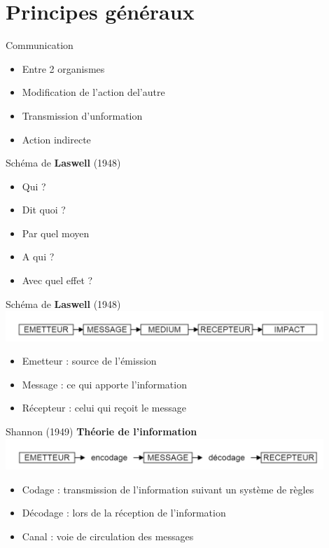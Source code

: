 \section{Principes généraux}

\begin{frame}
	\begin{block}{Communication}
		\begin{itemize}
			\item{Entre 2 organismes}
			\item{Modification de l'action del'autre}
			\item{Transmission d'unformation}
			\item{Action indirecte}
		\end{itemize}
	\end{block}
\end{frame}

\begin{frame}
	\begin{block}{Schéma de \textbf{Laswell} (1948)}
		\begin{itemize}
			\item{Qui ?}
			\item{Dit quoi ?}
			\item{Par quel moyen}
			\item{A qui ?}
			\item{Avec quel effet ?}
		\end{itemize}
	\end{block} \pause

	\begin{block}{Schéma de \textbf{Laswell} (1948)}
		\includegraphics[width=12cm]{laswell.png}
		\begin{itemize}
			\item{Emetteur : source de l'émission}
			\item{Message : ce qui apporte l'information}
			\item{Récepteur : celui qui reçoit le message}
		\end{itemize}
	\end{block}
\end{frame}

\begin{frame}
	\begin{block}{Shannon (1949)}
		\textbf{Théorie de l'information} 
		\includegraphics[width=12cm]{shannon.png}
		\begin{itemize}
			\item{Codage : transmission de l'information suivant un système de règles}
			\item{Décodage : lors de la réception de l'information}
			\item{Canal : voie de circulation des messages}
		\end{itemize}
	\end{block}
\end{frame}


